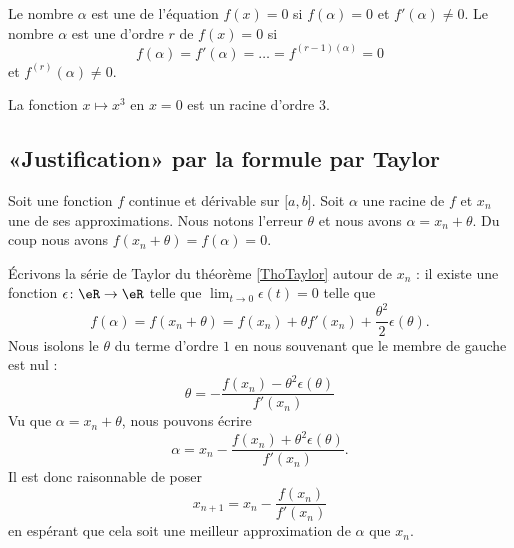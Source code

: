 \begin{definition}      \label{DEFooXSOQooAnWqKM}
    Le nombre \( \alpha\) est une  de l'équation \( f(x)=0\) si \( f(\alpha)=0\) et \( f'(\alpha)\neq 0\). Le nombre \( \alpha\) est une  d'ordre \( r\) de \( f(x)=0\) si
    \begin{equation}
        f(\alpha)=f'(\alpha)=\ldots=f^{(r-1)(\alpha)}=0
    \end{equation}
    et \( f^{(r)}(\alpha)\neq 0\).
\end{definition}

\begin{example}
    La fonction \( x\mapsto x^3\) en \( x=0\) est un racine d'ordre \( 3\).
\end{example}

\subsection{«Justification» par la formule par Taylor}

    Soit une fonction \( f\) continue et dérivable sur \( \mathopen[ a , b \mathclose]\). Soit \( \alpha\) une racine de \( f\) et \( x_n\) une de ses approximations.  Nous notons l'erreur \( \theta\) et nous avons \( \alpha=x_n+\theta\). Du coup nous avons \( f(x_n+\theta)=f(\alpha)=0\). 

    Écrivons la série de Taylor du théorème \ref{ThoTaylor} autour de \( x_n\) : il existe une fonction \( \epsilon\colon \eR\to \eR\) telle que \( \lim_{t\to 0} \epsilon(t)=0\) telle que
    \begin{equation}        \label{EQooOPUBooYaznay}
        f(\alpha)=f(x_n+\theta)=f(x_n)+\theta f'(x_n)+\frac{ \theta^2 }{ 2 }\epsilon(\theta).
    \end{equation}
    Nous isolons le \( \theta\) du terme d'ordre \( 1\) en nous souvenant que le membre de gauche est nul :
    \begin{equation}
        \theta=-\frac{ f(x_n)-\theta^2\epsilon(\theta) }{ f'(x_n) }
    \end{equation}
    Vu que \( \alpha=x_n+\theta\), nous pouvons écrire
    \begin{equation}
        \alpha=x_n-\frac{ f(x_n)+\theta^2\epsilon(\theta) }{ f'(x_n) }.
    \end{equation}
    Il est donc raisonnable de poser
    \begin{equation}
        x_{n+1}=x_n-\frac{ f(x_n) }{ f'(x_n) }
    \end{equation}
    en espérant que cela soit une meilleur approximation de \( \alpha\) que \( x_n\).

